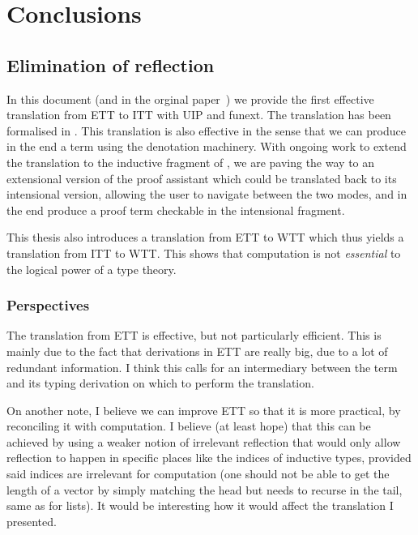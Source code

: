 \chapter{Conclusions}

\section*{Elimination of reflection}

In this document (and in the orginal paper~)
we provide the first effective translation from \acrshort{ETT} to \acrshort{ITT}
with \acrshort{UIP} and \acrshort{funext}. The translation has been formalised
in \Coq.
This translation is also effective in the sense that we can produce in the end a
\Coq term using the \MetaCoq denotation machinery.
%
With ongoing work to extend the translation to the inductive fragment
of \Coq, we are paving the way to an extensional version of the \Coq
proof assistant which could be translated back to its intensional
version, allowing the user to navigate between the two modes, and in
the end produce a proof term checkable in the intensional fragment.

This thesis also introduces a translation from \acrshort{ETT} to \acrshort{WTT}
which thus yields a translation from \acrshort{ITT} to \acrshort{WTT}. This
shows that computation is not \emph{essential} to the logical power of a type
theory.

\subsection{Perspectives}

The translation from \acrshort{ETT} is effective, but not particularly
efficient. This is mainly due to the fact that derivations in \acrshort{ETT}
are really big, due to a lot of redundant information. I think this calls for
an intermediary between the term and its typing derivation on which to perform
the translation.

On another note, I believe we can improve \acrshort{ETT} so that it is more
practical, by reconciling it with computation. I believe (at least hope) that
this can be achieved by using a weaker notion of irrelevant reflection that
would only allow reflection to happen in specific places like the indices of
inductive types, provided said indices are irrelevant for computation (one
should not be able to get the length of a vector by simply matching the head
but needs to recurse in the tail, same as for lists).
It would be interesting how it would affect the translation I presented.

